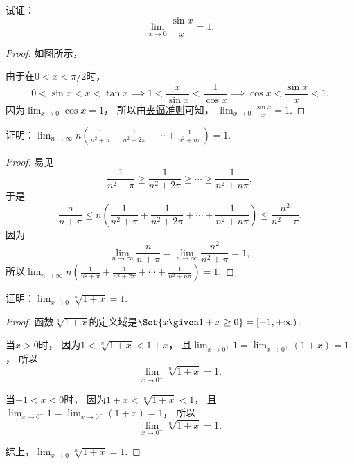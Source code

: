 \begin{example}[重要极限I]
试证：\begin{equation}\label{equation:函数极限.重要极限1}
	\lim_{x\to0} \frac{\sin x}{x} = 1.
\end{equation}
\begin{proof}
如图所示，
\begin{center}
\end{center}
由于在\(0 < x < \pi/2\)时，\[
	0 < \sin x < x < \tan x
	\implies
	1 < \frac{x}{\sin x} < \frac{1}{\cos x}
	\implies
	\cos x < \frac{\sin x}{x} < 1.
\]
因为\(\lim_{x\to0}\cos x = 1\)，
所以由\hyperref[theorem:数列极限.夹逼准则]{夹逼准则}可知，
\(\lim_{x\to0} \frac{\sin x}{x} = 1\).
\end{proof}
\end{example}

\begin{example}
证明：\(\lim_{n\to\infty} n \left(\frac1{n^2+\pi}+\frac1{n^2+2\pi}+\dotsb+\frac1{n^2+n\pi}\right)=1\).
\begin{proof}
易见\[
	\frac1{n^2+\pi}
	\geq \frac1{n^2+2\pi}
	\geq \dotsb
	\geq \frac1{n^2+n\pi},
\]
于是\[
	\frac{n}{n+\pi}
	\leq
	n \left(\frac1{n^2+\pi}+\frac1{n^2+2\pi}+\dotsb+\frac1{n^2+n\pi}\right)
	\leq
	\frac{n^2}{n^2+\pi}.
\]
因为\[
	\lim_{n\to\infty} \frac{n}{n+\pi}
	= \lim_{n\to\infty} \frac{n^2}{n^2+\pi}
	= 1,
\]
所以\(\lim_{n\to\infty} n \left(\frac1{n^2+\pi}+\frac1{n^2+2\pi}+\dotsb+\frac1{n^2+n\pi}\right)=1\).
\end{proof}
\end{example}

\begin{example}
证明：\(\lim_{x\to0} \sqrt[n]{1+x} = 1\).
\begin{proof}
函数\(\sqrt[n]{1+x}\)的定义域是\(\Set{ x \given 1+x\geq 0 } = [-1,+\infty)\).

当\(x > 0\)时，
因为\(1 < \sqrt[n]{1+x} < 1+x\)，
且\(\lim_{x\to0^+} 1 = \lim_{x\to0^+}(1+x) = 1\)，
所以\[
	\lim_{x\to0^+} \sqrt[n]{1+x} = 1.
\]

当\(-1 < x < 0\)时，
因为\(1+x < \sqrt[n]{1+x} < 1\)，
且\(\lim_{x\to0^-} 1 = \lim_{x\to0^-}(1+x) = 1\)，
所以\[
	\lim_{x\to0^-} \sqrt[n]{1+x} = 1.
\]

综上，\(\lim_{x\to0} \sqrt[n]{1+x} = 1\).
\end{proof}
\end{example}

